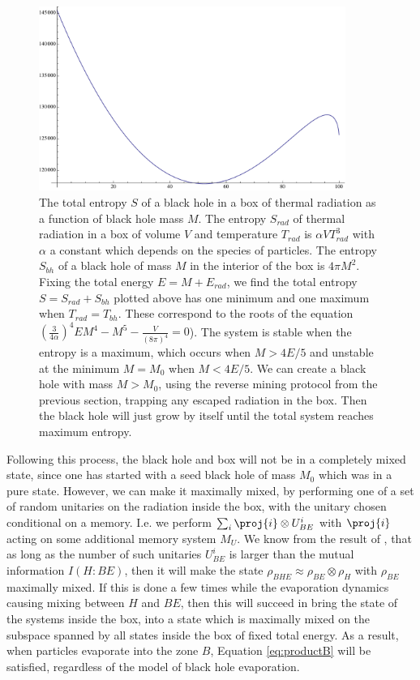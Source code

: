 \documentclass[12pt,a4paper]{article}
\begin{document}
\begin{figure}
\includegraphics[width=10cm]{initialmass.pdf}
	\caption{The total entropy $S$ of a black hole in a box of thermal radiation as a function of black hole mass $M$. The entropy $S_{rad}$ of thermal radiation in a box of volume $V$ and temperature $T_{rad}$ is $\alpha V T_{rad}^3$ with $\alpha$ a constant which depends on the species of particles. The entropy $S_{bh}$ of a black hole of mass $M$ in the interior of the box is $4\pi M^2$. Fixing the total energy $E=M+E_{rad}$, we find the total entropy 
	$S=S_{rad}+S_{bh}$ plotted above has one minimum and one maximum when $T_{rad}=T_{bh}$. These correspond to the roots of the equation 
	$(\frac{3}{4\alpha})^4EM^4-M^5-\frac{V}{(8\pi)^4}=0$). The system is stable when the entropy is a maximum, which occurs when $M>4E/5$ \cite{hawking1976black} and unstable at the minimum $M=M_0$ when $M<4E/5$.  We can create a black hole with mass $M>M_0$, using the reverse mining protocol from the previous section, trapping any escaped radiation in the box. Then the black hole will just grow by itself until the total system reaches maximum entropy.
	}
\label{fig:bhbox}
\end{figure}

Following this process, the black hole and box will not be in a completely mixed state, since one has started with a seed black hole of mass $M_0$ which was in a pure state. However, we can make it maximally mixed, by performing one of a set of random unitaries on the radiation inside the box, with the unitary chosen conditional on a memory. I.e. we perform 
$\sum_i\proj{i}\otimes U^i_{BE}$ with $\proj{i}$ acting on some additional memory system $M_U$.  We know from the result of \cite{GroismanPW04}, that as long as the number of such unitaries $U^i_{BE}$ is larger than the mutual information $I(H:BE)$, then it will make the state $\rho_{BHE}\approx\rho_{BE}\otimes
\rho_H$ with $\rho_{BE}$ maximally mixed. If this is done a few times while the evaporation dynamics causing mixing between $H$ and $BE$, then this will  succeed in bring the state of the systems inside the box, into a state which is maximally mixed on the subspace spanned by all states inside the box of fixed total energy. As a result, when particles evaporate into the zone $B$,  Equation \eqref{eq:productB} will be satisfied, regardless of the model of black hole evaporation.
\end{document}
